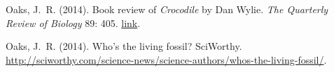 \myHangIndent
Oaks, J.\ R.
(2014).
Book review of \emph{Crocodile} by Dan Wylie.
\emph{The Quarterly Review of Biology} 89: 405. \href{http://dx.doi.org/10.1086/678660}{link}.

\myHangIndent
Oaks, J.\ R.
(2014).
Who's the living fossil?
SciWorthy.
\href{http://sciworthy.com/science-news/science-authors/whos-the-living-fossil/}{
    http://sciworthy.com/\allowbreak{}science-news/\allowbreak{}science-authors/\allowbreak{}whos-the-living-fossil/}.

